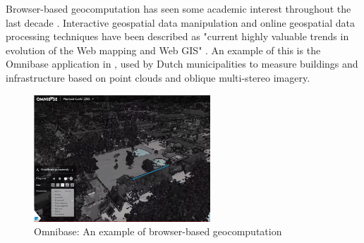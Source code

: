 

Browser-based geocomputation has seen some academic interest throughout the last decade \cite{hamilton_client-side_2014, panidi_hybrid_2015, kulawiak_analysis_2019}.
Interactive geospatial data manipulation and online geospatial data processing techniques have been described as "current highly valuable trends in evolution of the Web mapping and Web GIS" \cite{panidi_hybrid_2015}. 
An example of this is the Omnibase application \citep{geodelta_omnibase_2022} in , used by Dutch municipalities to measure buildings and infrastructure based on point clouds and oblique multi-stereo imagery.

\begin{figure}
  \centering
  \graphicspath{ {../../assets/images/background/geo-web/} }
  \includegraphics[width=250px]{omnibase.png}
  \caption{Omnibase: An example of browser-based geocomputation \citep{geodelta_omnibase_2022}}
  \label{fig:1:omnibase}
\end{figure}

